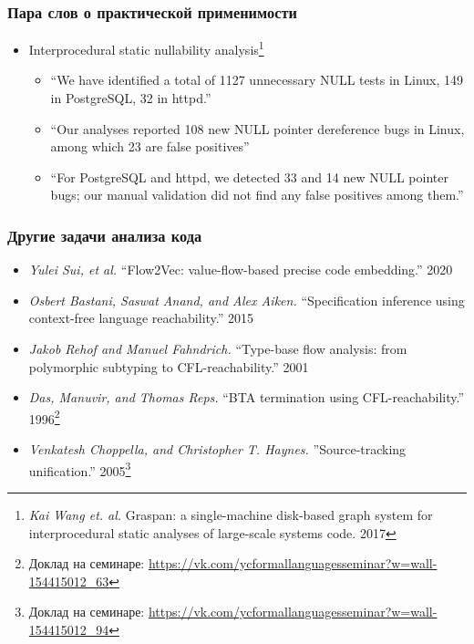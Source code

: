 \documentclass{beamer}
\begin{document}
\begin{frame}[fragile]

  \frametitle{Пара слов о практической применимости}
  \begin{itemize}
\item Interprocedural static nullability analysis\footnote{\emph{Kai Wang et. al.} Graspan: a single-machine disk-based graph system for interprocedural static analyses of large-scale systems code. 2017}

\begin{itemize}
   \item ``We have identified a total of 1127 unnecessary NULL tests in Linux, 149 in PostgreSQL,
   32 in httpd.''
   \item ``Our analyses reported 108 new NULL pointer dereference bugs in Linux, among which 23 are false positives''
   \item ``For PostgreSQL and httpd, we detected 33 and 14 new NULL pointer bugs; our manual validation did not find any false positives among them.''
\end{itemize}

\end{itemize}

\end{frame}


\begin{frame}[fragile]

  \frametitle{Другие задачи анализа кода}
  \begin{itemize}
    \item \emph{Yulei Sui, et al.} ``Flow2Vec: value-flow-based precise code embedding.'' 2020
    \pause
    \item \emph{Osbert Bastani, Saswat Anand, and Alex Aiken.} ``Specification inference using context-free language reachability.'' 2015
    \item \emph{Jakob Rehof and Manuel Fahndrich.} ``Type-base flow analysis: from polymorphic subtyping to CFL-reachability.'' 2001
    \pause
    \item \emph{Das, Manuvir, and Thomas Reps.} ``BTA termination using CFL-reachability.'' 1996\footnote{Доклад на семинаре: \url{https://vk.com/ycformallanguagesseminar?w=wall-154415012_63}}
    \pause
    \item \emph{Venkatesh Choppella, and Christopher T. Haynes.} ''Source-tracking unification.'' 2005\footnote{Доклад на семинаре: \url{https://vk.com/ycformallanguagesseminar?w=wall-154415012_94}}
  \end{itemize}

\end{frame}
\end{document}
